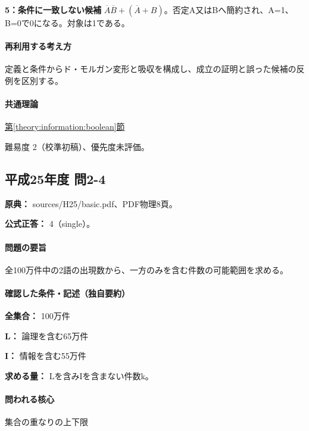 \noindent\textbf{5：条件に一致しない候補} \(\overline A\overline B+(\overline A+B)\)。否定A又はBへ簡約され、A=\allowbreak{}1、B=\allowbreak{}0で0になる。対象は1である。\par

\paragraph{再利用する考え方} 定義と条件からド・モルガン変形と吸収を構成し、成立の証明と誤った候補の反例を区別する。

\paragraph{共通理論} \hyperref[theory:information:boolean]{第\ref*{theory:information:boolean}節}

\par 難易度 2（校準初稿）、優先度未評価。

\subsection{平成25年度 問2-4}
\label{q:h25-reg-basic-2-4}

\noindent\textbf{原典：} sources/H25/basic.pdf、PDF物理8頁。

\textbf{公式正答：} 4（single）。

\paragraph{問題の要旨} 全100万件中の2語の出現数から、一方のみを含む件数の可能範囲を求める。

\paragraph{確認した条件・記述（独自要約）}\mbox{}\par

\noindent\textbf{全集合：} 100万件\par

\noindent\textbf{L：} 論理を含む65万件\par

\noindent\textbf{I：} 情報を含む55万件\par

\noindent\textbf{求める量：} Lを含みIを含まない件数k。\par

\paragraph{問われる核心} 集合の重なりの上下限


